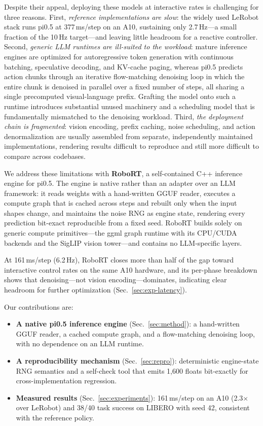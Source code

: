 \documentclass[11pt]{article}
\begin{document}
Despite their appeal, deploying these models at interactive rates is
challenging for three reasons. First, \emph{reference implementations are
slow}: the widely used LeRobot \cite{lerobot} stack runs pi0.5 at
377\,ms/step on an A10, sustaining only 2.7\,Hz---a small fraction of the
10\,Hz target---and leaving little headroom for a reactive controller.
Second, \emph{generic LLM runtimes are ill-suited to the workload}: mature
inference engines are optimized for autoregressive token generation with
continuous batching, speculative decoding, and KV-cache paging, whereas
pi0.5 predicts action chunks through an iterative flow-matching denoising
loop \cite{flowmatching} in which the entire chunk is denoised in parallel
over a fixed number of steps, all sharing a single precomputed
visual-language prefix. Grafting the model onto such a runtime introduces
substantial unused machinery and a scheduling model that is fundamentally
mismatched to the denoising workload. Third, \emph{the deployment chain is
fragmented}: vision encoding, prefix caching, noise scheduling, and action
denormalization are usually assembled from separate, independently
maintained implementations, rendering results difficult to reproduce and
still more difficult to compare across codebases.

We address these limitations with \textbf{RoboRT}, a self-contained C++
inference engine for pi0.5. The engine is native rather than an adapter over
an LLM framework: it reads weights with a hand-written GGUF reader, executes
a compute graph that is cached across steps and rebuilt only when the input
shapes change, and maintains the noise RNG as engine state, rendering every
prediction bit-exact reproducible from a fixed seed. RoboRT builds solely on
generic compute primitives---the ggml graph runtime with its CPU/CUDA
backends and the SigLIP \cite{siglip} vision tower---and contains no
LLM-specific layers.

At 161\,ms/step (6.2\,Hz), RoboRT closes more than half of the gap toward
interactive control rates on the same A10 hardware, and its per-phase
breakdown shows that denoising---not vision encoding---dominates,
indicating clear headroom for further optimization
(Sec.~\ref{sec:exp-latency}).

Our contributions are:
\begin{itemize}
  \item \textbf{A native pi0.5 inference engine} (Sec.~\ref{sec:method}):
        a hand-written GGUF reader, a cached compute graph, and a
        flow-matching denoising loop, with no dependence on an LLM runtime.
  \item \textbf{A reproducibility mechanism} (Sec.~\ref{sec:repro}):
        deterministic engine-state RNG semantics and a self-check tool that
        emits 1,600 floats bit-exactly for cross-implementation regression.
  \item \textbf{Measured results} (Sec.~\ref{sec:experiments}):
        161\,ms/step on an A10 (2.3$\times$ over LeRobot) and 38/40 task
        success on LIBERO with seed 42, consistent with the reference policy.
\end{itemize}
\end{document}

